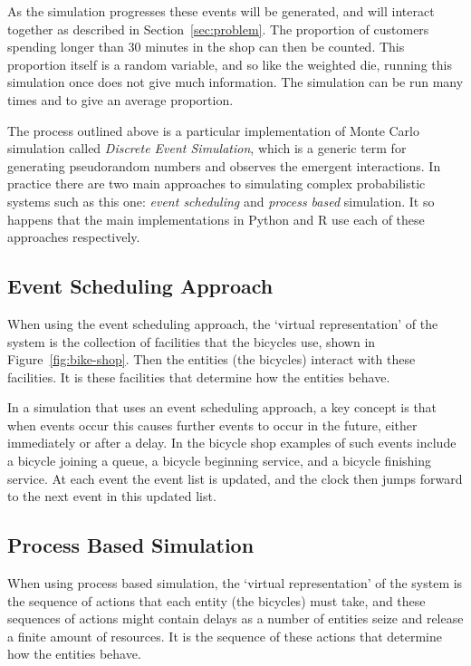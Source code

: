 As the simulation progresses these events will be generated, and will interact
together as described in Section~\ref{sec:problem}.
The proportion of customers spending longer than 30 minutes in the shop can then
be counted. This proportion itself is a random variable, and so like the
weighted die, running this simulation once does not give much information.
The simulation can be run many times and to give an average proportion.

The process outlined above is a particular implementation of Monte Carlo
simulation called \textit{Discrete Event Simulation}, which is a generic term
for generating pseudorandom numbers and observes the emergent interactions. In
practice there are two main approaches to simulating complex probabilistic
systems such as this one: \textit{event scheduling} and
\textit{process based} simulation.  It so happens that the main
implementations in Python and R use each of these approaches respectively.

\subsection{Event Scheduling Approach}

When using the event scheduling approach, the `virtual representation' of the
system is the collection of facilities that the bicycles use, shown in
Figure~\ref{fig:bike-shop}. Then the entities (the bicycles) interact with these
facilities. It is these facilities that determine how the entities behave.

In a simulation that uses an event scheduling approach, a key concept is that
when events occur this causes further events to occur in the future, either
immediately or after a delay.
In the bicycle shop examples of such events include a bicycle joining a queue, a
bicycle beginning service, and a bicycle finishing service. At each event the
event list is updated, and the clock then jumps forward to the next event in
this updated list.

\subsection{Process Based Simulation}

When using process based simulation, the `virtual
representation' of the system is the sequence of actions that each entity
(the bicycles) must take, and these sequences of actions might contain delays as
a number of entities seize and release a finite amount of resources. It is the
sequence of these actions that determine how the entities behave.

